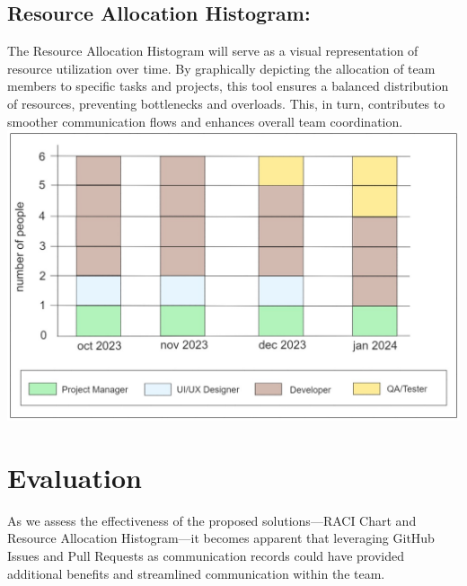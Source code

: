 \documentclass[12pt,titlepage,a4paper]{report}
\begin{document}
        \subsection{Resource Allocation Histogram:}
        The Resource Allocation Histogram will serve as a visual representation of resource utilization over time. By graphically depicting the allocation of team members to specific tasks and projects, this tool ensures a balanced distribution of resources, preventing bottlenecks and overloads. This, in turn, contributes to smoother communication flows and enhances overall team coordination.
        \\ \includegraphics[width=\textwidth]{images/figures/resource-allocation-histogram.jpg}
    \section{Evaluation}
    As we assess the effectiveness of the proposed solutions—RACI Chart and Resource Allocation Histogram—it becomes apparent that leveraging GitHub Issues and Pull Requests as communication records could have provided additional benefits and streamlined communication within the team.
\end{document}
